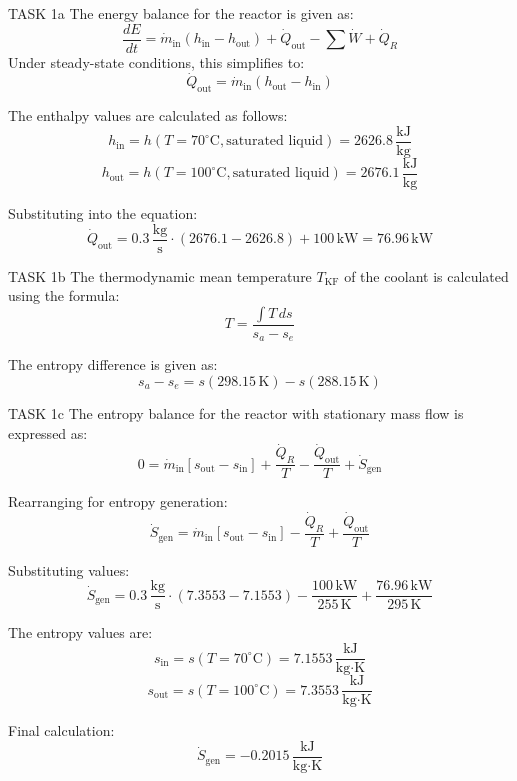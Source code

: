 TASK 1a  
The energy balance for the reactor is given as:  
\[
\frac{dE}{dt} = \dot{m}_{\text{in}} (h_{\text{in}} - h_{\text{out}}) + \dot{Q}_{\text{out}} - \sum \dot{W} + \dot{Q}_R
\]  
Under steady-state conditions, this simplifies to:  
\[
\dot{Q}_{\text{out}} = \dot{m}_{\text{in}} (h_{\text{out}} - h_{\text{in}})
\]  

The enthalpy values are calculated as follows:  
\[
h_{\text{in}} = h(T = 70^\circ\text{C}, \text{saturated liquid}) = 2626.8 \, \frac{\text{kJ}}{\text{kg}}
\]  
\[
h_{\text{out}} = h(T = 100^\circ\text{C}, \text{saturated liquid}) = 2676.1 \, \frac{\text{kJ}}{\text{kg}}
\]  

Substituting into the equation:  
\[
\dot{Q}_{\text{out}} = 0.3 \, \frac{\text{kg}}{\text{s}} \cdot (2676.1 - 2626.8) + 100 \, \text{kW} = 76.96 \, \text{kW}
\]  

TASK 1b  
The thermodynamic mean temperature \( T_{\text{KF}} \) of the coolant is calculated using the formula:  
\[
T = \frac{\int T \, ds}{s_a - s_e}
\]  

The entropy difference is given as:  
\[
s_a - s_e = s(298.15 \, \text{K}) - s(288.15 \, \text{K})
\]  

TASK 1c  
The entropy balance for the reactor with stationary mass flow is expressed as:  
\[
0 = \dot{m}_{\text{in}} [s_{\text{out}} - s_{\text{in}}] + \frac{\dot{Q}_R}{T} - \frac{\dot{Q}_{\text{out}}}{T} + \dot{S}_{\text{gen}}
\]  

Rearranging for entropy generation:  
\[
\dot{S}_{\text{gen}} = \dot{m}_{\text{in}} [s_{\text{out}} - s_{\text{in}}] - \frac{\dot{Q}_R}{T} + \frac{\dot{Q}_{\text{out}}}{T}
\]  

Substituting values:  
\[
\dot{S}_{\text{gen}} = 0.3 \, \frac{\text{kg}}{\text{s}} \cdot (7.3553 - 7.1553) - \frac{100 \, \text{kW}}{255 \, \text{K}} + \frac{76.96 \, \text{kW}}{295 \, \text{K}}
\]  

The entropy values are:  
\[
s_{\text{in}} = s(T = 70^\circ\text{C}) = 7.1553 \, \frac{\text{kJ}}{\text{kg·K}}
\]  
\[
s_{\text{out}} = s(T = 100^\circ\text{C}) = 7.3553 \, \frac{\text{kJ}}{\text{kg·K}}
\]  

Final calculation:  
\[
\dot{S}_{\text{gen}} = -0.2015 \, \frac{\text{kJ}}{\text{kg·K}}
\]